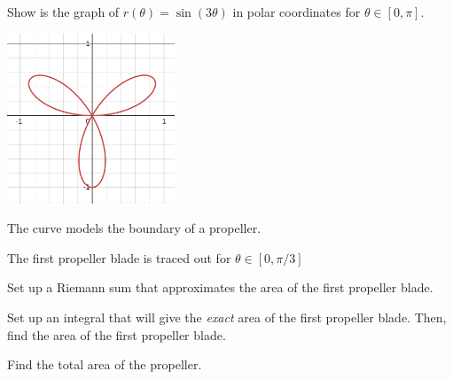 \documentclass{workbook}
\begin{document}
\begin{slide}
	\question

		Show is the graph of $\displaystyle
		r(\theta)=\sin(3\theta)
		$
		in polar coordinates
		for $\theta\in[0,\pi]$.
		\begin{center}
	\includegraphics[height=2in]{images/parametric2.png}
		\end{center}

	
	The curve models the boundary of a propeller.

	\begin{parts}
		\item The first propeller blade is traced out for $\theta\in[0,\pi/3]$
		
		Set up a Riemann sum that approximates the area of the first propeller
		blade.

		\item Set up an integral that will give the \emph{exact} area of the
		first propeller blade. Then, find the area of the first propeller blade.

		\item Find the total area of the propeller.
	\end{parts}
\end{slide}
\end{document}
